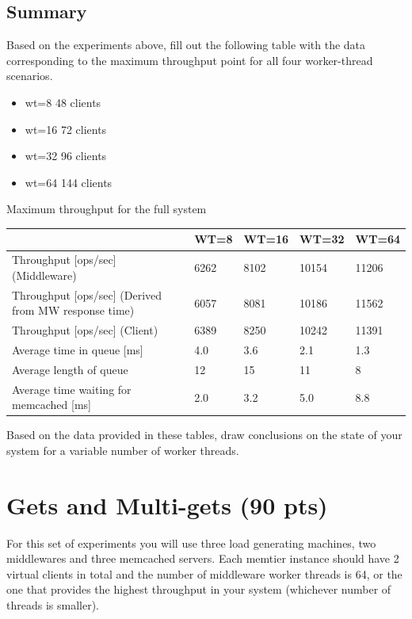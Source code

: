 \documentclass[11pt,a4paper]{article}
\begin{document}
\subsection{Summary}

Based on the experiments above, fill out the following table with the data corresponding to the maximum throughput point for all four worker-thread scenarios.
\begin{itemize}
	\item wt=8 48 clients
	\item wt=16 72 clients
	\item wt=32 96 clients
	\item wt=64 144 clients
\end{itemize}

\begin{center}
	{Maximum throughput for the full system}
	\begin{tabular}{|l|p{1.5cm}|p{1.5cm}|p{1.5cm}|p{1.5cm}|}
		\hline                                            			& WT=8 & WT=16 & WT=32 & WT=64 \\ 
		\hline Throughput [ops/sec] (Middleware)                    & 6262 &  8102 & 10154 & 11206 \\ 
		\hline Throughput [ops/sec] (Derived from MW response time) & 6057 &  8081 & 10186 & 11562 \\ 
		\hline Throughput [ops/sec] (Client)              			& 6389 &  8250 & 10242 & 11391 \\ 
		\hline Average time in queue [ms]                 			&  4.0 &   3.6 &   2.1 &   1.3 \\ 
		\hline Average length of queue                    			&   12 &    15 &    11 &     8 \\ 
		\hline Average time waiting for memcached [ms]    			&  2.0 &   3.2 &   5.0 &   8.8 \\ 
		\hline 
	\end{tabular}
\end{center}

Based on the data provided in these tables, draw conclusions on the state of your system for a variable number of worker threads.

\section{Gets and Multi-gets (90 pts)}

For this set of experiments you will use three load generating machines, two middlewares and three memcached servers. Each memtier instance should have 2 virtual clients in total and the number of middleware worker threads is 64, or the one that provides the highest throughput in your system (whichever number of threads is smaller).
\end{document}
